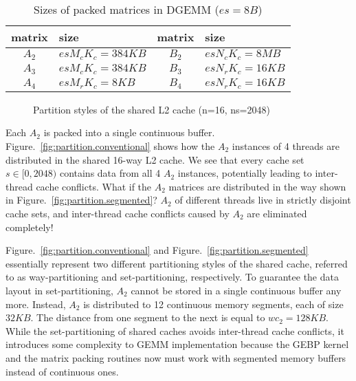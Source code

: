 \begin{table}
  \centering
  \caption{Sizes of packed matrices in DGEMM ($es = 8B$)}
  \label{tab:msizes}
  \begin{tabular}{cl|cl}
    \toprule
    matrix & size & matrix & size \\
    \midrule
    $A_2$ & $es M_c K_c = 384KB$ & $B_2$ & $es N_c K_c = 8MB$ \\
    $A_3$ & $es M_c K_c = 384KB$ & $B_3$ & $es N_r K_c = 16KB$ \\
    $A_4$ & $es M_r K_c = 8KB$   & $B_4$ & $es N_r K_c = 16KB$ \\
    \bottomrule
  \end{tabular}
\end{table}

\begin{figure}
  \centering
  \caption{Partition styles of the shared L2 cache (n=16, ns=2048)}
  \label{fig:partition}
\end{figure}

Each $A_2$ is packed into a single continuous buffer.
Figure.~\ref{fig:partition.conventional} shows how the
$A_2$ instances of 4 threads are distributed in the shared 16-way L2 cache.
We see that every cache set $s \in [0,2048)$ contains
data from all 4 $A_2$ instances,
potentially leading to inter-thread cache conflicts.
What if the $A_2$ matrices are distributed in the way shown in
Figure.~\ref{fig:partition.segmented}?
$A_2$ of different threads live in strictly disjoint cache sets,
and inter-thread cache conflicts caused by $A_2$ are eliminated completely!

Figure.~\ref{fig:partition.conventional} and Figure.~\ref{fig:partition.segmented}
essentially represent two different partitioning styles of the shared cache,
referred to as way-partitioning and set-partitioning, respectively.
To guarantee the data layout in set-partitioning,
$A_2$ cannot be stored in a single continuous buffer any more.
Instead, $A_2$ is distributed to 12 continuous memory segments, each of size $32KB$.
The distance from one segment to the next is equal to $wc_2=128KB$.
While the set-partitioning of shared caches avoids inter-thread cache conflicts,
it introduces some complexity to GEMM implementation
because the GEBP kernel and the matrix packing routines
now must work with segmented memory buffers instead of continuous ones.

